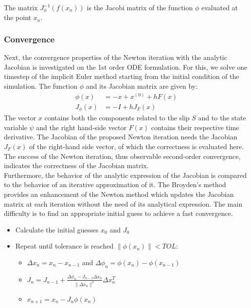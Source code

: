 The matrix $J_\phi^{-1}(f(x_n))$ is the Jacobi matrix of the function $\phi$ evaluated at the point $x_n$. \\

\subsubsection{Convergence}
Next, the convergence properties of the Newton iteration with the analytic Jacobian is investigated on the 1st order ODE formulation. For this, we solve one timestep of the implicit Euler method starting from the initial condition of the simulation. The function $\phi$ and its Jacobian matrix are given by: 
\begin{align}
\phi(x) &= -x + x^{(0)} + h F(x) \\
J_\phi(x) &= -I + h J_F(x)
\end{align}
The vector $x$ contains both the components related to the slip $S$ and to the state variable $\psi$ and the right hand-side vector $F(x)$ contains their respective time derivative. The Jacobian of the proposed Newton iteration needs the Jacobian $J_F(x)$ of the right-hand side vector, of which the correctness is evaluated here. The success of the Newton iteration, thus observable second-order convergence, indicates the correctness of the Jacobian matrix. \\
Furthermore, the behavior of the analytic expression of the Jacobian is compared to the behavior of an iterative approximation of it. The Broyden's method \cite{BroydenIteration} provides an enhancement of the Newton method which updates the Jacobian matrix at each iteration without the need of its analytical expression. The main difficulty is to find an appropriate initial guess to achieve a fast convergence. 

\begin{itemize}
	\item Calculate the initial guesses $x_0$ and $J_0$
	\item Repeat until tolerance is reached $\|\phi(x_n)\| < TOL$: 
	\begin{itemize}
		\item $\Delta x_n = x_n - x_{n-1}$ and $\Delta \phi_n = \phi(x_n) - \phi(x_{n-1})$ 
		\item $J_n = J_{n-1} + \frac{\Delta \phi_n - J_{n-1}\Delta x_n}{\|\Delta x_n\|^2} \Delta x_n^T$
		\item $x_{n+1} = x_n - J_n \phi(x_n)$
	\end{itemize} 
\end{itemize}

